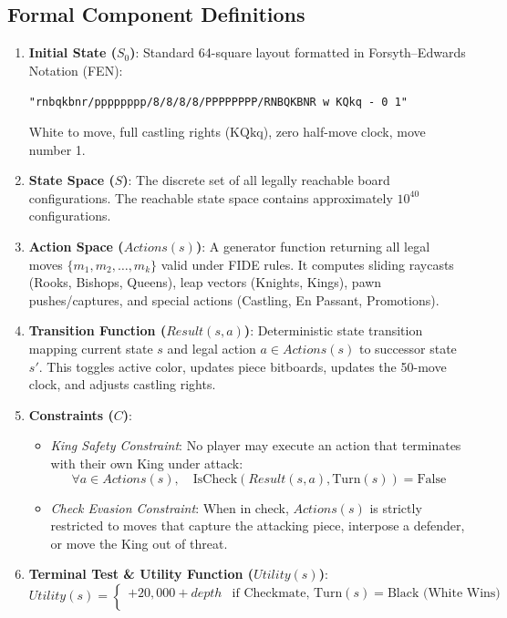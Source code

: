 \documentclass[11pt,a4paper]{article}
\begin{document}
\subsection{Formal Component Definitions}
\begin{enumerate}[leftmargin=*]
    \item \textbf{Initial State ($S_0$)}: Standard 64-square layout formatted in Forsyth--Edwards Notation (FEN):
    \begin{center}
    \texttt{"rnbqkbnr/pppppppp/8/8/8/8/PPPPPPPP/RNBQKBNR w KQkq - 0 1"}
    \end{center}
    White to move, full castling rights ($\text{KQkq}$), zero half-move clock, move number 1.
    \item \textbf{State Space ($S$)}: The discrete set of all legally reachable board configurations. The reachable state space contains approximately $10^{40}$ configurations.
    \item \textbf{Action Space ($Actions(s)$)}: A generator function returning all legal moves $\{m_1, m_2, \dots, m_k\}$ valid under FIDE rules. It computes sliding raycasts (Rooks, Bishops, Queens), leap vectors (Knights, Kings), pawn pushes/captures, and special actions (Castling, En Passant, Promotions).
    \item \textbf{Transition Function ($Result(s, a)$)}: Deterministic state transition mapping current state $s$ and legal action $a \in Actions(s)$ to successor state $s'$. This toggles active color, updates piece bitboards, updates the 50-move clock, and adjusts castling rights.
    \item \textbf{Constraints ($C$)}:
    \begin{itemize}
        \item \textit{King Safety Constraint}: No player may execute an action that terminates with their own King under attack:
        $$\forall a \in Actions(s), \quad \text{IsCheck}(Result(s, a), \text{Turn}(s)) = \text{False}$$
        \item \textit{Check Evasion Constraint}: When in check, $Actions(s)$ is strictly restricted to moves that capture the attacking piece, interpose a defender, or move the King out of threat.
    \end{itemize}
    \item \textbf{Terminal Test \& Utility Function ($Utility(s)$)}:
    $$Utility(s) = \begin{cases}
    +20,000 + depth & \text{if Checkmate, Turn}(s) = \text{Black (White Wins)} \\

\end{cases}$$
\end{enumerate}
\end{document}
